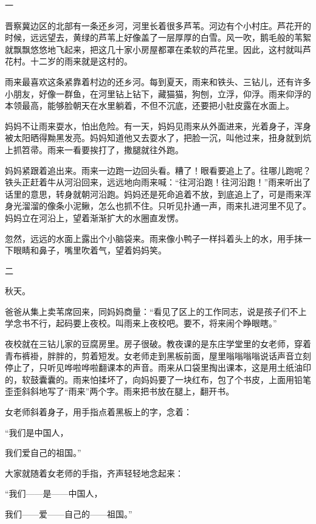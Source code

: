 \documentclass[12pt,UTF-8,openany]{ctexbook}
\begin{document}
\begin{large}
    
    一
    
    晋察冀边区的北部有一条还乡河，河里长着很多芦苇。河边有个小村庄。芦花开的时候，远远望去，黄绿的芦苇上好像盖了一层厚厚的白雪。风一吹，鹅毛般的苇絮就飘飘悠悠地飞起来，把这几十家小房屋都罩在柔软的芦花里。因此，这村就叫芦花村。十二岁的雨来就是这村的。
    
    雨来最喜欢这条紧靠着村边的还乡河。每到夏天，雨来和铁头、三钻儿，还有许多小朋友，好像一群鱼，在河里钻上钻下，藏猫猫，狗刨，立浮，仰浮。雨来仰浮的本领最高，能够脸朝天在水里躺着，不但不沉底，还要把小肚皮露在水面上。
    
    妈妈不让雨来耍水，怕出危险。有一天，妈妈见雨来从外面进来，光着身子，浑身被太阳晒得黝黑发亮。妈妈知道他又去耍水了，把脸一沉，叫他过来，扭身就到炕上抓笤帚。雨来一看要挨打了，撒腿就往外跑。
    
    妈妈紧跟着追出来。雨来一边跑一边回头看。糟了！眼看要追上了。往哪儿跑呢？铁头正赶着牛从河沿回来，远远地向雨来喊：“往河沿跑！往河沿跑！”雨来听出了话里的意思，转身就朝河沿跑。妈妈还是死命追着不放，到底追上了，可是雨来浑身光溜溜的像条小泥鳅，怎么也抓不住。只听见扑通一声，雨来扎进河里不见了。妈妈立在河沿上，望着渐渐扩大的水圈直发愣。
    
    忽然，远远的水面上露出个小脑袋来。雨来像小鸭子一样抖着头上的水，用手抹一下眼睛和鼻子，嘴里吹着气，望着妈妈笑。
    
    二
    
    秋天。
    
    爸爸从集上卖苇席回来，同妈妈商量：“看见了区上的工作同志，说是孩子们不上学念书不行，起码要上夜校。叫雨来上夜校吧。要不，将来闹个睁眼瞎。”
    
    夜校就在三钻儿家的豆腐房里。房子很破。教夜课的是东庄学堂里的女老师，穿着青布裤褂，胖胖的，剪着短发。女老师走到黑板前面，屋里嗡嗡嗡嗡说话声音立刻停止了，只听见哗啦哗啦翻课本的声音。雨来从口袋里掏出课本，这是用土纸油印的，软鼓囊囊的。雨来怕揉坏了，向妈妈要了一块红布，包了个书皮，上面用铅笔歪歪斜斜地写了“雨来”两个字。雨来把书放在腿上，翻开书。
    
    女老师斜着身子，用手指点着黑板上的字，念着：
    
    “我们是中国人，
    
    我们爱自己的祖国。”
    
    大家就随着女老师的手指，齐声轻轻地念起来：
    
    “我们——是——中国人，
    
    我们——爱——自己的——祖国。”
    

\end{large}
\end{document}
